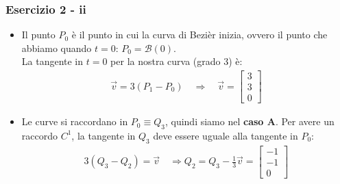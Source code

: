 \documentclass{beamer}
\begin{document}
\begin{frame}
	\frametitle{Esercizio 2 - ii}
	\begin{itemize} 
		\item Il punto $P_0$ \`e il punto in cui la curva di Bezi\`er inizia, ovvero il punto che abbiamo quando $t=0$: $P_0 = \mathcal B (0)$. \\
                    La tangente in $t=0$ per la nostra curva (grado 3) \`e:
                    \begin{align*}
                        \overrightarrow v = 3(P_1 - P_0) \quad \Rightarrow \quad \overrightarrow v = \begin{bmatrix} 3 \\ 3 \\ 0 \end{bmatrix}
                    \end{align*}
            \item Le curve si raccordano in $P_0 \equiv Q_3$, quindi siamo nel \textbf{caso A}.
                Per avere un raccordo $C^1$, la tangente in $Q_3$ deve essere uguale alla tangente in $P_0$:
                    \begin{align*}
                        3(Q_3 - Q_2) = \overrightarrow v \quad \Rightarrow Q_2 = Q_3 -\frac{1}{3} \overrightarrow v = \begin{bmatrix} -1 \\ -1 \\ 0 \end{bmatrix}
                    \end{align*}
	\end{itemize}
\end{frame}
\end{document}
